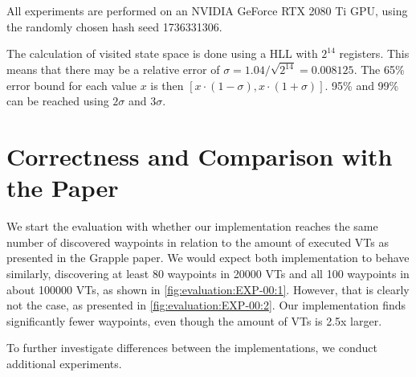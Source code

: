 \documentclass[
fancyheadings, %
%
%
]{stsreprt}
\begin{document}
All experiments are performed on an NVIDIA GeForce RTX 2080 Ti GPU, using the randomly chosen hash seed 1736331306.

The calculation of visited state space is done using a HLL with $2^{14}$ registers.
This means that there may be a relative error of $\sigma=1.04 / \sqrt{2^{14}}=\num{0.008125}$.
The 65\% error bound for each value $x$ is then $\left[x \cdot (1-\sigma), x \cdot (1+\sigma)\right]$.
95\% and 99\% can be reached using $2\sigma$ and $3\sigma$.

\section{Correctness and Comparison with the Paper}
\label{section:evaluation:correctness-comparison-with-paper}

We start the evaluation with whether our implementation reaches the same number of discovered waypoints in relation to the amount of executed VTs as presented in the Grapple paper.
We would expect both implementation to behave similarly, discovering at least 80 waypoints in \num{20000} VTs and all 100 waypoints in about \num{100000} VTs, as shown in \cref{fig:evaluation:EXP-00:1}.
However, that is clearly not the case, as presented in \cref{fig:evaluation:EXP-00:2}.
Our implementation finds significantly fewer waypoints, even though the amount of VTs is 2.5x larger.

To further investigate differences between the implementations, we conduct additional experiments.
\end{document}
